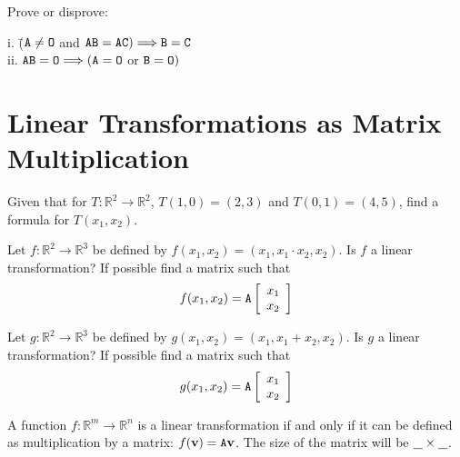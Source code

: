 	
\noindent {} Prove or disprove:
 \begin{tabbing}
 	 \indent i. \quad \= ($\texttt{A} \neq \texttt{O}$ and $\texttt{AB} = \texttt{AC}) \Longrightarrow \texttt{B} = \texttt{C}$\\
 	 \indent ii. \> $\texttt{AB} = \texttt{O} \Longrightarrow (\texttt{A}=\texttt{O} $ or $ \texttt{B} = \texttt{O})$
 \end{tabbing}
 
\vspace{.5cm}

\section{Linear Transformations as Matrix Multiplication}    \label{Linear Transformations as Matrix Multiplication}

\begin{myexa}[\bd{a}]
	Given that for $T:\mathbb{R}^2 \rightarrow \mathbb{R}^2$, $T(1,0) = (2,3)$ and $T(0,1) = (4,5)$, find a formula for $T(x_1,x_2)$.
\end{myexa}

\begin{myexb}[\bd{b}]
	Let $f:\mathbb{R}^2 \rightarrow \mathbb{R}^3$ be defined by $f(x_1,x_2) =(x_1, x_1\cdot x_2,x_2)$. Is $f$ a linear transformation? If possible find a matrix   such that \[f(x_1,x_2) = \texttt{A}\left[ \begin{array}{c} x_1 \\ x_2 \end{array} \right] \]
\end{myexb}


\begin{myexc}[\bd{c}]
		Let $g:\mathbb{R}^2 \rightarrow \mathbb{R}^3$ be defined by $g(x_1,x_2) =(x_1, x_1+x_2,x_2)$. Is $g$ a linear transformation? If possible find a matrix   such that \[g(x_1,x_2) = \texttt{A}\left[ \begin{array}{c} x_1 \\ x_2 \end{array} \right]\]
\end{myexc}
\vspace{.5cm}
\begin{theorem}
	A function $f: \mathbb{R}^m \longrightarrow \mathbb{R}^n$ is a linear transformation if and only if it can be defined as multiplication by a matrix: $f(\mathbf{v} ) = \texttt{A}\mathbf{v}$. The size of the matrix will be $\underline{\hspace{.1in} } \times \underline{\hspace{.1in} } $. 
\end{theorem}
\vspace{-.3in}\hspace{5in}\begin{annotation}
\end{annotation}
\vspace{.5cm}

